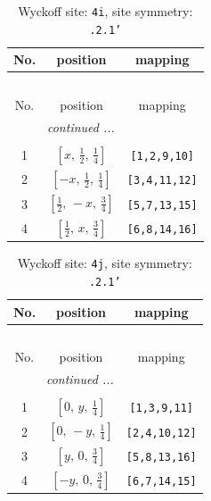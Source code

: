 \documentclass[fleqn,8pt]{jsarticle}
\begin{document}
\renewcommand{\arraystretch}{1.2}
\begin{longtable}{ccc}
\caption{Wyckoff site: {\tt 4i}, site symmetry: {\tt .2.1'}}
 \\
 \hline \hline
No. & position & mapping \\ \hline \endfirsthead

\multicolumn{2}{l}{\tablename\ \thetable{}} \\
 \hline \hline
No. & position & mapping \\ \hline \endhead

 \hline \hline
\multicolumn{2}{r}{\footnotesize\it continued ...} \\ \endfoot

 \hline \hline
\multicolumn{2}{r}{} \\ \endlastfoot

1 & $\left[ x,\, \frac{1}{2},\, \frac{1}{4} \right]$ & {\tt [1,2,9,10]} \\ \hline
2 & $\left[ - x,\, \frac{1}{2},\, \frac{1}{4} \right]$ & {\tt [3,4,11,12]} \\ \hline
3 & $\left[ \frac{1}{2},\, - x,\, \frac{3}{4} \right]$ & {\tt [5,7,13,15]} \\ \hline
4 & $\left[ \frac{1}{2},\, x,\, \frac{3}{4} \right]$ & {\tt [6,8,14,16]} \\
\end{longtable}
\renewcommand{\arraystretch}{1.2}
\begin{longtable}{ccc}
\caption{Wyckoff site: {\tt 4j}, site symmetry: {\tt .2.1'}}
 \\
 \hline \hline
No. & position & mapping \\ \hline \endfirsthead

\multicolumn{2}{l}{\tablename\ \thetable{}} \\
 \hline \hline
No. & position & mapping \\ \hline \endhead

 \hline \hline
\multicolumn{2}{r}{\footnotesize\it continued ...} \\ \endfoot

 \hline \hline
\multicolumn{2}{r}{} \\ \endlastfoot

1 & $\left[ 0,\, y,\, \frac{1}{4} \right]$ & {\tt [1,3,9,11]} \\ \hline
2 & $\left[ 0,\, - y,\, \frac{1}{4} \right]$ & {\tt [2,4,10,12]} \\ \hline
3 & $\left[ y,\, 0,\, \frac{3}{4} \right]$ & {\tt [5,8,13,16]} \\ \hline
4 & $\left[ - y,\, 0,\, \frac{3}{4} \right]$ & {\tt [6,7,14,15]} \\
\end{longtable}
\end{document}

